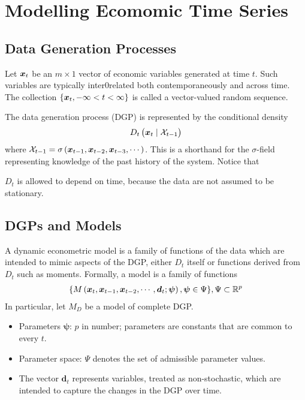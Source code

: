 \section[Modelling Ecomomic Time Series]{Modelling Ecomomic Time Series}
\subsection{Data Generation Processes}
Let $\bm{x}_{t}$ be an $m\times 1$ vector of economic variables generated at time $t$. Such variables are typically inter0related both contemporaneously and across time. The collection $\{\bm{x}_{t},-\infty<t<\infty\}$ is called a vector-valued random sequence. 

The data generation process (DGP) is represented by the conditional density
\begin{eqnarray*}
D_{t}\left(\bm{x}_{t}\mid\mathcal{X}_{t-1}\right)
\end{eqnarray*}
where $\mathcal{X}_{t-1}=\sigma\left(\bm{x}_{t-1},\bm{x}_{t-2},\bm{x}_{t-3},\cdots\right)$. This is a shorthand for the $\sigma$-field representing knowledge of the past history of the system. Notice that
\begin{remark}
\item $D_{t}$ is allowed to depend on time, because the data are not assumed to be stationary.
\end{remark}

\subsection{DGPs and Models}
A dynamic econometric model is a family of functions of the data which are intended to mimic aspects of the DGP, either $D_{t}$ itself or functions derived from $D_{t}$ such as moments. Formally, a model is a family of functions
\begin{eqnarray*}
\{M\left(\bm{x}_{t},\bm{x}_{t-1},\bm{x}_{t-2},\cdots,\bm{d}_{t};\bm{\psi}\right),\bm{\psi}\in\Psi\},\Psi\subset\mathbb{R}^{p}
\end{eqnarray*}
In particular, let $M_{D}$ be a model of complete DGP.
\begin{itemize}
\item Parameters $\bm{\psi}$: $p$ in number; parameters are constants that are common to every $t$.
\item Parameter space: $\Psi$ denotes the set of admissible parameter values.
\item The vector $\bm{d}_{t}$ represents variables, treated as non-stochastic, which are intended to capture the changes in the DGP over time. 
\end{itemize}

